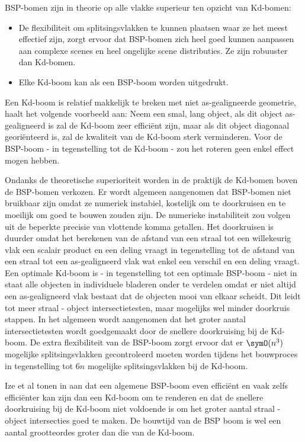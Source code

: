 BSP-bomen zijn in theorie op alle vlakke superieur ten opzicht van Kd-bomen:
\begin{itemize}
	\item De flexibiliteit om splitsingsvlakken te kunnen plaatsen waar ze het meest effectief zijn, zorgt ervoor dat BSP-bomen zich heel goed kunnen aanpassen aan complexe scenes en heel ongelijke scene distributies. Ze zijn robuuster dan Kd-bomen.
	\item Elke Kd-boom kan als een BSP-boom worden uitgedrukt.
\end{itemize}
Een Kd-boom is relatief makkelijk te breken met niet as-gealigneerde geometrie, \cite{Ize} haalt het volgende voorbeeld aan: Neem een smal, lang object, als dit object as-gealigneerd is zal de Kd-boom zeer efficiënt zijn, maar als dit object diagonaal georiënteerd is, zal de kwaliteit van de Kd-boom sterk verminderen.
Voor de BSP-boom - in tegenstelling tot de Kd-boom - zou het roteren geen enkel effect mogen hebben.


Ondanks de theoretische superioriteit worden in de praktijk de Kd-bomen boven de BSP-bomen verkozen.
Er wordt algemeen aangenomen dat BSP-bomen niet bruikbaar zijn omdat ze numeriek instabiel, kostelijk om te doorkruisen en te moeilijk om goed te bouwen zouden zijn.
De numerieke instabiliteit zou volgen uit de beperkte precisie van vlottende komma getallen.  
Het doorkruisen is duurder omdat het berekenen van de afstand van een straal tot een willekeurig vlak een scalair product en een deling vraagt in tegenstelling tot de afstand van een straal tot een as-gealigneerd vlak wat enkel een verschil en een deling vraagt.
Een optimale Kd-boom is - in tegenstelling tot een optimale BSP-boom - niet in staat alle objecten in individuele bladeren onder te verdelen omdat er niet altijd een as-gealigneerd vlak bestaat dat de objecten mooi van elkaar scheidt.  
Dit leidt tot meer straal - object intersectietesten, maar mogelijks wel minder doorkruis stappen.
In het algemeen wordt aangenomen dat het groter aantal intersectietesten wordt goedgemaakt door de snellere doorkruising bij de Kd-boom.
De extra flexibiliteit van de BSP-boom zorgt ervoor dat er $\symO(n^3)$ mogelijke splitsingsvlakken gecontroleerd moeten worden tijdens het bouwproces in tegenstelling tot $6n$ mogelijke splitsingsvlakken bij de Kd-boom.


Ize et al tonen in \cite{Ize} aan dat een algemene BSP-boom even efficiënt en vaak zelfs efficiënter kan zijn dan een Kd-boom om te renderen en dat de snellere doorkruising bij de Kd-boom niet voldoende is om het groter aantal straal - object intersecties goed te maken.
De bouwtijd van de BSP boom is wel een aantal grootteordes groter dan die van de Kd-boom. 

